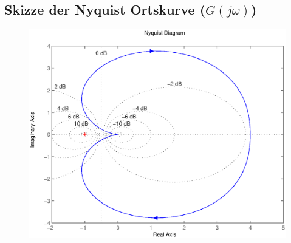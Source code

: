 \documentclass[a4paper,10pt,fleqn]{article}
\begin{document}
\subsection*{Skizze der Nyquist Ortskurve ($G(j\omega)$)}
\begin{figure}[h!]
\center
\includegraphics[width=\textwidth]{nyquist.eps}
\end{figure}
\end{document}
